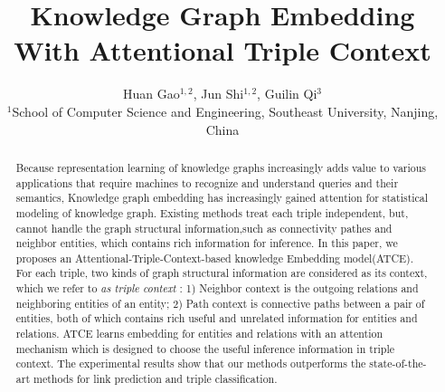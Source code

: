 \documentclass{article}
\title{Knowledge Graph Embedding With Attentional Triple Context}
\author{Huan Gao$^{1,2}$, Jun Shi$^{1,2}$, Guilin Qi$^{3}$\\
$^{1}$School of Computer Science and Engineering,
Southeast University, Nanjing, China  \\
}
\begin{document}
\maketitle

\begin{abstract}
Because representation learning of knowledge graphs increasingly adds value to various applications that require machines to recognize and understand queries and their semantics, Knowledge graph embedding has increasingly gained attention for statistical modeling of knowledge graph. Existing methods treat each triple independent, but, cannot handle the graph structural information,such as connectivity pathes and neighbor entities, which contains rich information for inference. In this paper, we proposes an Attentional-Triple-Context-based knowledge Embedding model(ATCE). For each triple, two kinds of graph structural information are considered as its context, which we refer to \emph{as triple context} : 1) Neighbor context is the outgoing relations and neighboring entities of an entity; 2) Path context is connective paths between a pair of entities, both of which contains rich useful and unrelated information for entities and relations. ATCE learns embedding for entities and relations with an attention mechanism which is designed to choose the useful inference information in triple context. The experimental results show that our methods outperforms the state-of-the-art methods for link prediction and triple classification.
\end{abstract}












%

\end{document}
